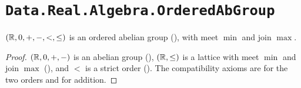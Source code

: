 \section{\texttt{Data.Real.Algebra.OrderedAbGroup}}

\begin{theorem}
  \label{ROrderedAbGroup}
  $(\mathbb{R}, 0, +, -, <, \le)$ is an ordered abelian group (), with meet $\min$ and join $\max$.
\end{theorem}
\begin{proof}
  $(\mathbb{R}, 0, +, -)$ is an abelian group (), $(\mathbb{R}, \le)$ is a lattice with meet $\min$ and join $\max$ (), and $<$ is a strict order (). The compatibility axioms are  for the two orders and  for addition.
\end{proof}
